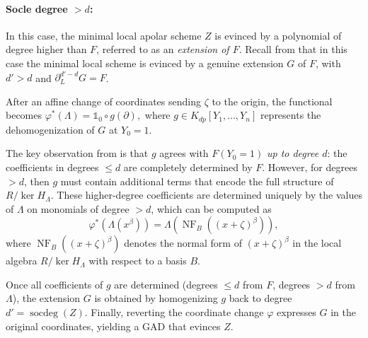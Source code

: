 \documentclass[a4paper,11p]{amsart}
\begin{document}

\paragraph{\textbf{Socle degree $> d$:}} 
In this case, the minimal local apolar scheme $Z$ is evinced by a polynomial of degree higher than $F$, referred to as an \emph{extension of $F$}.  Recall from  that in this case the minimal local scheme is evinced by a genuine extension $G$ of $F$, with $d'>d$ and $\partial_L^{d'-d} G = F$.

After an affine change of coordinates sending $\zeta$ to the origin, the functional becomes $
\varphi^*(\Lambda) = \mathds{1}_0 \circ g(\partial),
$ 
where $g \in K_{dp}[Y_1,\dots,Y_n]$ represents the dehomogenization of $G$ at $Y_0=1$.  


The key observation from \cite[Proposition~4]{BJPR} is that $g$ agrees with $F(Y_0=1)$ \emph{up to degree $d$}: the coefficients in degrees $\le d$ are completely determined by $F$.  
However, for degrees $> d$, then $g$ must contain additional terms that encode the full structure of $R/\ker H_\Lambda$.  
These higher-degree coefficients are determined uniquely by the values of $\Lambda$ on monomials of degree $>d$, which can be computed as
\[
\varphi^*(\Lambda(x^\beta)) = \Lambda(\operatorname{NF}_B((x+\zeta)^\beta)),
\]
where $\operatorname{NF}_B((x+\zeta)^\beta)$ denotes the normal form of $(x+\zeta)^\beta$ in the local algebra $R/\ker H_\Lambda$ with respect to a basis $B$.  

Once all coefficients of $g$ are determined (degrees $\le d$ from $F$, degrees $>d$ from $\Lambda$), the extension $G$ is obtained by homogenizing $g$ back to degree $d'=\operatorname{socdeg}(Z)$.  
Finally, reverting the coordinate change $\varphi$ expresses $G$ in the original coordinates, yielding a GAD that evinces $Z$.
\end{document}
